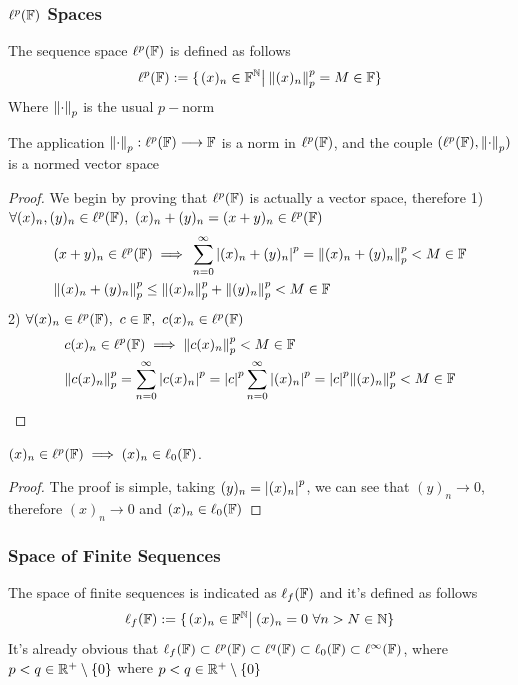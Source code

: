 \documentclass[../complete.tex]{subfiles}
\begin{document}
\subsubsection{$\ell^p(\mathbb{F})$ Spaces}
\begin{dfn}
	The sequence space $\ell^p(\mathbb{F})$ is defined as follows
	\begin{equation}
		\ell^p(\mathbb{F}):=\{\left.(x)_n\in\mathbb{F}^{\mathbb{N}}\right|_{}\norm{(x)_n}_{p}^p=M\in\mathbb{F}\}
		\label{eq:ellpspace}
	\end{equation}
	Where $\norm{\cdot}_{p}$ is the usual $p-$norm
\end{dfn}
\begin{prop}
	The application $\norm{\cdot}_{p}:\ell^p(\mathbb{F})\overset{}{\longrightarrow}\mathbb{F}$ is a norm in $\ell^p(\mathbb{F})$, and the couple $(\ell^p(\mathbb{F}),\norm{\cdot}_{p})$ is a normed vector space
\end{prop}
\begin{proof}
	We begin by proving that $\ell^p(\mathbb{F})$ is actually a vector space, therefore
	1) $\forall(x)_n,(y)_n\in\ell^p(\F),\ (x)_n+(y)_n=(x+y)_n\in\ell^p(\F)$
	\begin{equation*}
		\begin{aligned}
			&(x+y)_n\in\ell^p(\mathbb{F})\implies{}\sum_{n=0}^\infty\abs{(x)_n+(y)_n}^p=\norm{(x)_n+(y)_n}_{p}^p<M\in\mathbb{F}\\
			&\norm{(x)_n+(y)_n}_{p}^p\le\norm{(x)_n}_{p}^p+\norm{(y)_n}_{p}^p<M\in\mathbb{F}
		\end{aligned}
	\end{equation*}
	2) $\forall(x)_n\in\ell^p(\F),\ c\in\F,\ c(x)_n\in\ell^p(\F)$
	\begin{equation*}
		\begin{aligned}
			&c(x)_n\in\ell^p(\mathbb{F})\implies{}\norm{c(x)_n}_{p}^p<M\in\mathbb{F}\\
			&\norm{c(x)_n}_{p}^p=\sum_{n=0}^\infty\abs{c(x)_n}^p=\abs{c}^p\sum_{n=0}^\infty\abs{(x)_n}^p=\abs{c}^p\norm{(x)_n}_{p}^p<M\in\mathbb{F}
		\end{aligned}
	\end{equation*}
\end{proof}
\begin{rmk}
	$(x)_n\in\ell^p(\mathbb{F})\implies{}(x)_n\in\ell_0(\mathbb{F})$.
\end{rmk}
\begin{proof}
	The proof is simple, taking $(y)_n=\abs{(x)_n}^p$, we can see that $(y)_n\to0$, therefore $(x)_n\to0$ and $(x)_n\in\ell_0(\mathbb{F})$
\end{proof}
\subsubsection{Space of Finite Sequences}
\begin{dfn}
	The space of finite sequences is indicated as $\ell_f(\mathbb{F})$ and it's defined as follows
	\begin{equation}
		\ell_f(\F):=\{\derin{(x)_n\in\F^{\N}}(x)_n=0\ \forall n>N\in\N\}
		\label{eq:ellf}
	\end{equation}
	It's already obvious that $\ell_f(\mathbb{F})\subset\ell^p(\mathbb{F})\subset\ell^q(\mathbb{F})\subset\ell_0(\mathbb{F})\subset\ell^\infty(\mathbb{F})$, where $p<q\in\mathbb{R}^+\setminus\{0\}$ where $p<q\in\mathbb{R}^+\setminus\{0\}$
\end{dfn}
\end{document}
